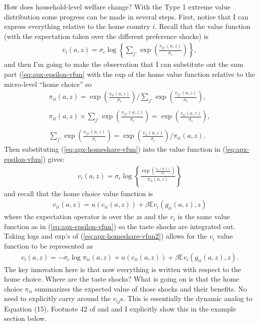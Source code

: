 \documentclass[12pt,pdftex]{article}
\begin{document}
\begin{onehalfspacing}
How does household-level welfare change? With the Type 1 extreme value distribution some progress can be made in several steps. First, notice that I can express everything relative to the home country $i$. Recall that the value function (with the expectation taken over the different preference shocks) is
\begin{align}
v_i(a, z) =  \sigma_{\epsilon} \log \left\{ \sum_{j'} \exp \left( \frac{  v_{ij'}(a, z)}{\sigma_{\epsilon}} \right) \right\},
\label{eq:apx-epsilon-vfun}
\end{align}
and then I'm going to make the observation that I can substitute out the sum part (\ref{eq:apx-epsilon-vfun} with the exp of the home value function relative to the micro-level ``home choice'' so
\begin{align}
\pi_{ii}(a, z) = \exp \left( \frac{ v_{ii}(a, z) }{\sigma_{\epsilon}} \right) \Bigg / \sum_{j'} \exp \left( \frac{ v_{ij'}(a, z) }{\sigma_{\epsilon}} \right), \\
\nonumber \\
\pi_{ii}(a, z) \times \sum_{j'} \exp \left( \frac{ v_{ij'}(a, z) }{\sigma_{\epsilon}} \right) = \exp \left( \frac{ v_{ii}(a, z) }{\sigma_{\epsilon}} \right), \\
\nonumber \\
\sum_{j'} \exp \left( \frac{ v_{ij'}(a, z) }{\sigma_{\epsilon}} \right) = \exp \left( \frac{ v_{ii}(a, z) }{\sigma_{\epsilon}} \right) \Bigg / \pi_{ii}(a, z).
\label{eq:apx-homeshare-vfun}
\end{align}
Then substituting (\ref{eq:apx-homeshare-vfun}) into the value function in (\ref{eq:apx-epsilon-vfun}) gives:
\begin{align}
v_i(a, z) =  \sigma_{\epsilon} \log \left\{ \frac{ \exp \left( \frac{  v_{ii}(a, z)}{\sigma_{\epsilon}}\right )}{\pi_{ii}(a,z)}  \right\}
\label{eq:apx-homeshare-vfun2}
\end{align}
and recall that the home choice value function is
\begin{align}
v_{ii}(a, z) = u(c_{ii}(a,z)) + \beta \mathbb{E} v_{i}(g_{ii}(a,z),z)
\end{align}
where the expectation operator is over the $z$s and the $v_{i}$ is the same value function as in (\ref{eq:apx-epsilon-vfun}) so the taste shocks are integrated out. Taking logs and exp's of (\ref{eq:apx-homeshare-vfun2}) allows for the $v_i$ value function to be represented as
\begin{align}
v_i(a, z) = -\sigma_{\epsilon} \log \pi_{ii}(a,z) + u(c_{ii}(a,z)) + \beta \mathbb{E} v_{i}(g_{ii}(a,z),z).
\label{eq:apx-home-valuefun}
\end{align}
The key innovation here is that now everything is written with respect to the home choice. Where are the taste shocks? What is going on is that the home choice $\pi_{ii}$ summarizes the expected value of those shocks and their benefits. No need to explicitly carry around the $v_{ij}$s. This is essentially the dynamic analog to Equation (15), Footnote 42 of \citet{eaton2002technology} and \citet{arkolakis2012new} and I explicitly show this in the example section below.


\end{onehalfspacing}
\end{document}
